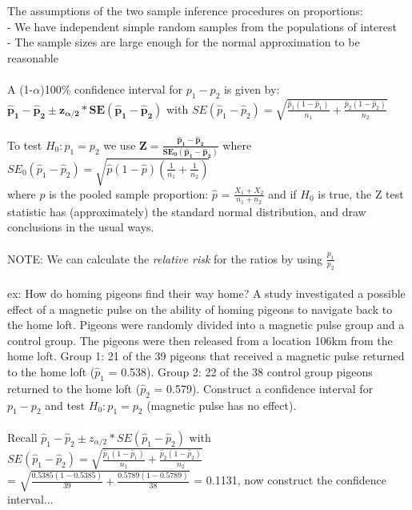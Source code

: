 \documentclass[12pt, a4paper]{article}
\begin{document}
	\noindent The assumptions of the two sample inference procedures on proportions: \\
	- We have independent simple random samples from the populations of interest \\
	- The sample sizes are large enough for the normal approximation to be reasonable \\~\\
	A (1-$\alpha$)100\% confidence interval for $p_1 - p_2$ is given by: $\bm{\hat{p}_1 - \hat{p}_2 \pm z_{\alpha/2} * SE(\hat{p}_1 - \hat{p}_2)}$ with $SE(\hat{p}_1 - \hat{p}_2) = \sqrt{\frac{\hat{p}_1(1-\hat{p}_1)}{n_1} + \frac{\hat{p}_2(1-\hat{p}_2)}{n_2}}$ \\~\\
	To test $H_0: p_1 = p_2$ we use $\bm{Z = \frac{\hat{p}_1 - \hat{p}_2}{SE_0(\hat{p}_1 - \hat{p}_2)}}$ where $SE_0(\hat{p}_1 - \hat{p}_2) = \sqrt{\hat{p}(1-\hat{p})(\frac{1}{n_1} + \frac{1}{n_2})}$ \\ where $\hat{p}$ is the pooled sample proportion: $\hat{p}$ = $\frac{X_1 + X_2}{n_1 + n_2}$ and if $H_0$ is true, the Z test statistic has (approximately) the standard normal distribution, and draw conclusions in the usual ways. \\~\\
	NOTE: We can calculate the \textit{relative risk} for the ratios by using $\frac{p_1}{p_2}$ \\~\\
	ex: How do homing pigeons find their way home? A study investigated a possible effect of a magnetic pulse on the ability of homing pigeons to navigate back to the home loft. Pigeons were randomly divided into a magnetic pulse group and a control group. The pigeons were then released from a location 106km from the home loft. Group 1: 21 of the 39 pigeons that received a magnetic pulse returned to the home loft ($\hat{p}_1$ = 0.538). Group 2: 22 of the 38 control group pigeons returned to the home loft ($\hat{p}_2$ = 0.579). Construct a confidence interval for $p_1 - p_2$ and test $H_0: p_1 = p_2$ (magnetic pulse has no effect). \\~\\
	Recall $\hat{p}_1 - \hat{p}_2 \pm z_{\alpha/2} * SE(\hat{p}_1 - \hat{p}_2)$ with $SE(\hat{p}_1 - \hat{p}_2) = \sqrt{\frac{\hat{p}_1(1-\hat{p}_1)}{n_1} + \frac{\hat{p}_2(1-\hat{p}_2)}{n_2}}$ \\ = $\sqrt{\frac{0.5385(1-0.5385)}{39} + \frac{0.5789(1-0.5789)}{38}}$ = 0.1131, now construct the confidence interval... \\
\end{document}
